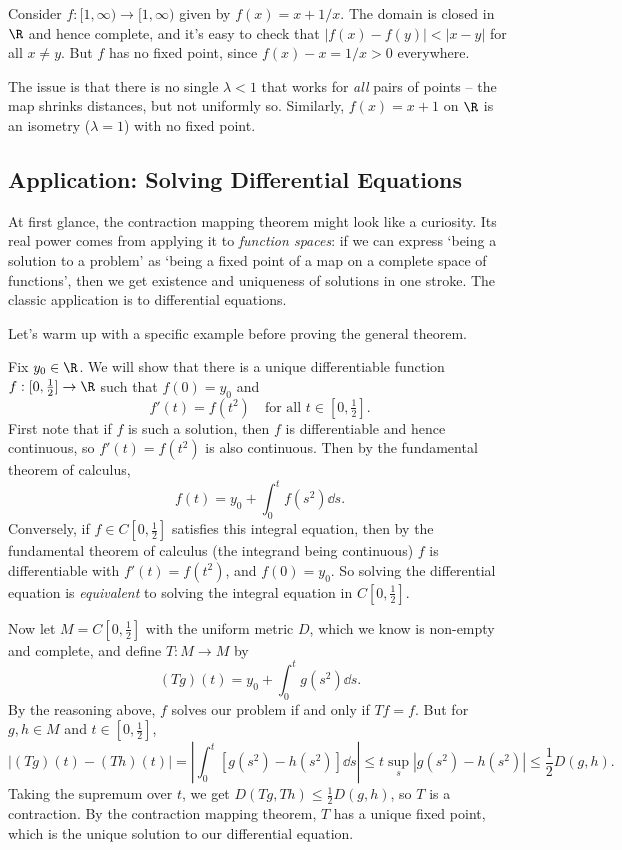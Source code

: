 \begin{example}
    Consider $f: [1, \infty) \rightarrow [1, \infty)$ given by $f(x) = x + 1/x$. The domain is closed in $\R$ and hence complete, and it's easy to check that $|f(x) - f(y)| < |x - y|$ for all $x \neq y$. But $f$ has no fixed point, since $f(x) - x = 1/x > 0$ everywhere.

    The issue is that there is no single $\lambda < 1$ that works for \emph{all} pairs of points -- the map shrinks distances, but not uniformly so. Similarly, $f(x) = x + 1$ on $\R$ is an isometry ($\lambda = 1$) with no fixed point.
\end{example}

\subsection{Application: Solving Differential Equations}

At first glance, the contraction mapping theorem might look like a curiosity. Its real power comes from applying it to \emph{function spaces}: if we can express `being a solution to a problem' as `being a fixed point of a map on a complete space of functions', then we get existence and uniqueness of solutions in one stroke. The classic application is to differential equations.

Let's warm up with a specific example before proving the general theorem.

\begin{example}
    Fix $y_0 \in \R$. We will show that there is a unique differentiable function $f: [0, \tfrac{1}{2}] \rightarrow \R$ such that $f(0) = y_0$ and
    $$
    f'(t) = f(t^2) \quad \text{for all } t \in [0, \tfrac{1}{2}].
    $$
    First note that if $f$ is such a solution, then $f$ is differentiable and hence continuous, so $f'(t) = f(t^2)$ is also continuous. Then by the fundamental theorem of calculus,
    $$
    f(t) = y_0 + \int_0^t f(s^2) \dd s.
    $$
    Conversely, if $f \in C[0, \tfrac{1}{2}]$ satisfies this integral equation, then by the fundamental theorem of calculus (the integrand being continuous) $f$ is differentiable with $f'(t) = f(t^2)$, and $f(0) = y_0$. So solving the differential equation is \emph{equivalent} to solving the integral equation in $C[0, \tfrac{1}{2}]$.

    Now let $M = C[0, \tfrac{1}{2}]$ with the uniform metric $D$, which we know is non-empty and complete, and define $T: M \rightarrow M$ by
    $$
    (Tg)(t) = y_0 + \int_0^t g(s^2) \dd s.
    $$
    By the reasoning above, $f$ solves our problem if and only if $Tf = f$. But for $g, h \in M$ and $t \in [0, \tfrac{1}{2}]$,
    $$
    |(Tg)(t) - (Th)(t)| = \left| \int_0^t \left[g(s^2) - h(s^2)\right] \dd s \right| \leq t \sup_{s} |g(s^2) - h(s^2)| \leq \frac{1}{2} D(g, h).
    $$
    Taking the supremum over $t$, we get $D(Tg, Th) \leq \frac{1}{2} D(g, h)$, so $T$ is a contraction. By the contraction mapping theorem, $T$ has a unique fixed point, which is the unique solution to our differential equation.
\end{example}

